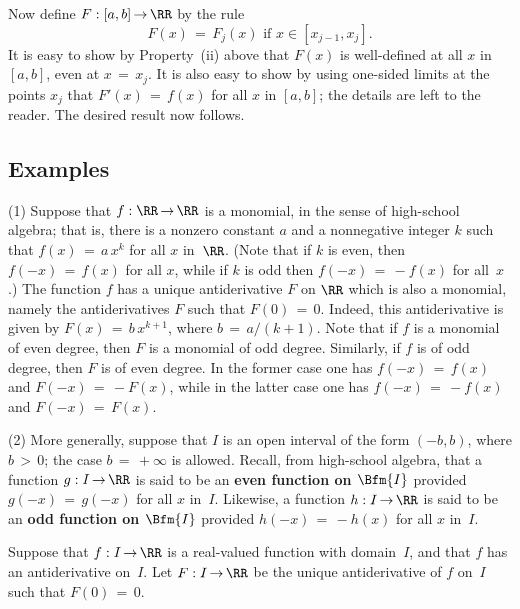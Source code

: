 \noindent Now define $F:[a,b] \,{\rightarrow}\, {\RR}$ by the rule
        \begin{displaymath}
        F(x) \,=\, F_{j}(x) \mbox{ if $x{\in}[x_{j-1},x_{j}]$}.
        \end{displaymath}
    It is easy to show by Property~(ii) above that $F(x)$ is well-defined at all $x$ in $[a,b]$, even at $x \,=\, x_{j}$.
    It is also easy to show by using one-sided limits at the points $x_{j}$ that $F'(x) \,=\, f(x)$ for all $x$ in $[a,b]$; the details are left to the reader.
    The desired result now follows. \Q

\VV

             \subsection{\small{\bf Examples}}
            \label{ExampE45.65}
\V

\hspace*{\parindent}(1) Suppose that $f:{\RR} \,{\rightarrow}\, {\RR}$ is a monomial, in the sense of high-school algebra;
    that is, there is a nonzero constant $a$ and a nonnegative integer $k$ such that $f(x) \,=\, a\,x^{k}$ for all $x$ in~${\RR}$.
    (Note that if $k$ is even, then $f(-x) \,=\, f(x)$ for all $x$, while if $k$ is odd then $f(-x) \,=\, -f(x)$ for all~$x$.)
    The function $f$ has a unique antiderivative $F$ on ${\RR}$ which is also a monomial, namely the antiderivatives $F$ such that $F(0) \,=\, 0$.
    Indeed, this antiderivative is given by $F(x) \,=\, b\,x^{k+1}$, where $b \,=\, a/(k+1)$.
    Note that if $f$ is a monomial of even degree, then $F$ is a monomial of odd  degree. Similarly, if $f$ is of odd degree, then $F$ is of even degree.
   In the former case one has $f(-x) \,=\, f(x)$ and $F(-x) \,=\, -F(x)$, while in the latter case one has $f(-x) \,=\, -f(x)$ and $F(-x) \,=\, F(x)$.

\V

        (2) More generally, suppose that $I$ is an open interval of the form $(-b,b)$, where $b\,>\,0$; the case $b \,=\, +{\infty}$ is allowed.
    Recall, from high-school algebra, that a function $g:I \,{\rightarrow}\, {\RR}$ is said to be an
    {\bf even function on $\Bfm{I}$} provided $g(-x) \,=\, g(-x)$ for all $x$ in~$I$.
    Likewise, a function $h:I \,{\rightarrow}\, {\RR}$ is said to be an {\bf odd function on $\Bfm{I}$} provided $h(-x) \,=\, -h(x)$ for all $x$ in~$I$.

        Suppose that $f:I \,{\rightarrow}\, {\RR}$ is a real-valued function with domain~$I$, and that $f$ has an antiderivative on~$I$.
    Let $F:I \,{\rightarrow}\, {\RR}$ be the unique antiderivative of $f$ on~$I$ such that $F(0) \,=\, 0$.

